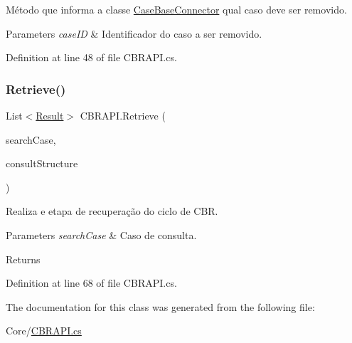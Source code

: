 Método que informa a classe \hyperlink{class_case_base_connector}{Case\+Base\+Connector} qual caso deve ser removido. 


\begin{DoxyParams}{Parameters}
{\em case\+ID} & Identificador do caso a ser removido.\\
\hline
\end{DoxyParams}


Definition at line 48 of file C\+B\+R\+A\+P\+I.\+cs.

\hypertarget{class_c_b_r_a_p_i_af1992aae5101968f2a851f1ac1c044d7}{}\label{class_c_b_r_a_p_i_af1992aae5101968f2a851f1ac1c044d7} 
\subsubsection{\texorpdfstring{Retrieve()}{Retrieve()}}
{\footnotesize\ttfamily List$<$\hyperlink{class_result}{Result}$>$ C\+B\+R\+A\+P\+I.\+Retrieve (\begin{DoxyParamCaption}\item[{\hyperlink{class_case}{Case}}]{search\+Case,  }\item[{\hyperlink{class_consult_structure}{Consult\+Structure}}]{consult\+Structure }\end{DoxyParamCaption})}



Realiza e etapa de recuperação do ciclo de C\+BR. 


\begin{DoxyParams}{Parameters}
{\em search\+Case} & Caso de consulta.\\
\hline
\end{DoxyParams}
\begin{DoxyReturn}{Returns}

\end{DoxyReturn}


Definition at line 68 of file C\+B\+R\+A\+P\+I.\+cs.



The documentation for this class was generated from the following file\+:\begin{DoxyCompactItemize}
\item 
Core/\hyperlink{_c_b_r_a_p_i_8cs}{C\+B\+R\+A\+P\+I.\+cs}\end{DoxyCompactItemize}
